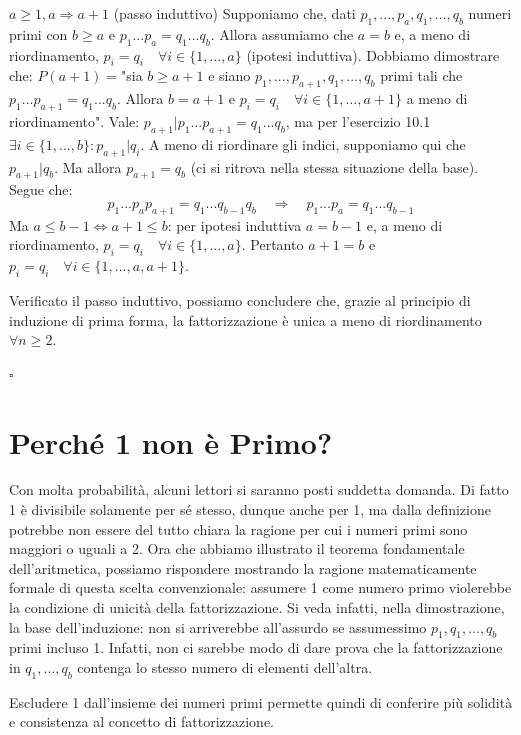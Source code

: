 \documentclass[oneside]{book}
\theoremstyle{remark}
\newcommand{\cvd}{\begin{flushright}$\square$\end{flushright}} %
\begin{document}
\begin{tcolorbox}[title={Teorema Fondamentale dell'Aritmetica}]
$a \geq 1, a \Rightarrow a+1$ (passo induttivo) Supponiamo che, dati $p_1,...,p_a,
q_1,...,q_b$ numeri primi con $b \geq a$ e $p_1...p_a = q_1...q_b$. Allora
assumiamo che $a=b$ e, a meno di riordinamento, $p_i = q_i \quad \forall i \in \{1,...,a\}$
(ipotesi induttiva). Dobbiamo dimostrare che: $P(a+1)= $"sia $b \geq a+1$ e siano
$p_1,...,p_{a+1},q_1,...,q_b$ primi tali che $p_1...p_{a+1} = q_1...q_b$.
Allora $b = a+1$ e $p_i = q_i \quad \forall i \in \{1,...,a+1\}$
a meno di riordinamento". Vale: $p_{a+1}|p_1...p_{a+1} = q_1...q_b$, ma per
l'esercizio 10.1 $\exists i \in \{1,...,b\}: p_{a+1}|q_i$. A meno di riordinare
gli indici, supponiamo qui che $p_{a+1}|q_b$. Ma allora $p_{a+1} = q_b$ (ci si
ritrova nella stessa situazione della base). Segue che:
\[ p_1...p_ap_{a+1} = q_1...q_{b-1}q_b \quad \Rightarrow \quad  p_1...p_a = q_1...q_{b-1} \]
Ma $a \leq b-1 \Leftrightarrow a+1 \leq b$: per ipotesi induttiva $a = b-1$ e,
a meno di riordinamento, $p_i = q_i \quad \forall i \in \{1,...,a\}$. Pertanto
$a+1 = b$ e $p_i = q_i \quad \forall i \in \{1,...,a,a+1\}$.

Verificato il passo induttivo, possiamo concludere che, grazie al principio di
induzione di prima forma, la fattorizzazione è unica a meno di riordinamento
$\forall n \geq 2$.
\cvd
\end{tcolorbox}
\section*{Perché 1 non è Primo?}
Con molta probabilità, alcuni lettori si saranno posti suddetta domanda. Di fatto
1 è divisibile solamente per sé stesso, dunque anche per 1, ma dalla definizione
potrebbe non essere del tutto chiara la ragione per cui i numeri primi
sono maggiori o uguali a 2. Ora che abbiamo illustrato il teorema fondamentale
dell'aritmetica, possiamo rispondere mostrando la ragione matematicamente
formale di questa scelta convenzionale: assumere 1 come numero primo violerebbe
la condizione di unicità della fattorizzazione. Si veda infatti, nella dimostrazione,
la base dell'induzione: non si arriverebbe
all'assurdo se assumessimo $p_1,q_1,...,q_b$ primi incluso 1. Infatti, non ci
sarebbe modo di dare prova che la fattorizzazione in $q_1,...,q_b$ contenga lo
stesso numero di elementi dell'altra.

Escludere 1 dall'insieme dei numeri primi permette quindi di conferire più
solidità e consistenza al concetto di fattorizzazione.
\end{document}
